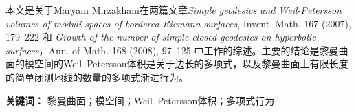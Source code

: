 \hspace*{2em}%
本文是关于Maryam Mirzakhani在两篇文章\emph{Simple geodesics and Weil-Petersson volumes of moduli spaces of bordered Riemann surfaces}, Invent. Math. 167 (2007), 179–222 和 \emph{Growth of the number of simple closed geodesics on hyperbolic surfaces}，Ann. of Math. 168 (2008), 97–125
中工作的综述。主要的结论是黎曼曲面的模空间的Weil--Petersson体积是关于边长的多项式，以及黎曼曲面上有限长度的简单闭测地线的数量的多项式渐进行为。

\bigskip

\noindent
\textbf{关键词：}
黎曼曲面；模空间；Weil--Petersson体积；多项式行为
